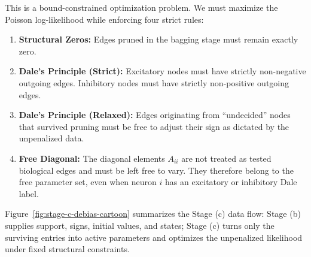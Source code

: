 \documentclass[11pt]{article}
\begin{document}
This is a bound-constrained optimization problem. We must maximize the Poisson log-likelihood while enforcing four strict rules:
\begin{enumerate}
    \item \textbf{Structural Zeros:} Edges pruned in the bagging stage must remain exactly zero.
    \item \textbf{Dale's Principle (Strict):} Excitatory nodes must have strictly non-negative outgoing edges. Inhibitory nodes must have strictly non-positive outgoing edges.
    \item \textbf{Dale's Principle (Relaxed):} Edges originating from ``undecided'' nodes that survived pruning must be free to adjust their sign as dictated by the unpenalized data.
    \item \textbf{Free Diagonal:} The diagonal elements $A_{ii}$ are not treated as tested biological edges and must be left free to vary. They therefore belong to the free parameter set, even when neuron $i$ has an excitatory or inhibitory Dale label.
\end{enumerate}

Figure~\ref{fig:stage-c-debias-cartoon} summarizes the Stage (c) data flow:
Stage (b) supplies support, signs, initial values, and states; Stage (c)
turns only the surviving entries into active parameters and optimizes the
unpenalized likelihood under fixed structural constraints.
\end{document}

